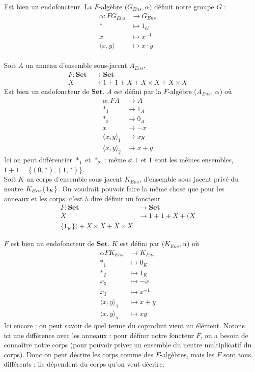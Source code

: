 \documentclass{article}
\begin{document}
Est bien un endofoncteur. La $F$-algèbre ($G_{Ens}, \alpha)$ définit notre groupe $G$ : 
\begin{align*}
    \alpha : F G_{Ens} & \rightarrow G_{Ens} \\
     * & \mapsto 1_G \\ 
     x & \mapsto x^{-1} \\ 
     \langle x,y \rangle & \mapsto x \cdot y
\end{align*}
\\ 
Soit $A$ un anneau d'ensemble sous-jacent $A_{Ens}$.
\begin{align*}
    F : \mathbf{Set}& \rightarrow \mathbf{Set} \\
      X & \rightarrow 1 + 1 + X + X \times X + X \times X
\end{align*}
Est bien un endofoncteur de $\mathbf{Set}$. $A$ est défini par la $F$-algèbre ($A_{Ens}$, $\alpha$) où 
\begin{align*}
    \alpha : F A & \rightarrow A \\
     *_1 & \mapsto 1_A \\
     *_2 & \mapsto 0_A \\ 
     x & \mapsto -x \\ 
      \langle x,y \rangle_1 & \mapsto xy \\ 
    \langle x,y \rangle_2 & \mapsto x+y
\end{align*}
Ici on peut différencier $*_1$ et $*_2$ : même si $1$ et $1$ sont les mêmes ensembles, $1+1 = \{ (0,*), (1,*) \}$. 
\\

Soit $K$ un corps d'ensemble sous jacent $K_{Ens}$, d'ensemble sous jacent privé du neutre $K_{Ens} \\ \{ 1_K \}$. On voudrait pouvoir faire la même chose que pour les anneaux et les corps, c'est à dire définir un foncteur 
\begin{align*}
    F : \mathbf{Set} &  \rightarrow \mathbf{Set} \\
      X & \rightarrow 1 + 1 + X + (X \\ \{1_K\}) + X \times X + X \times X
\end{align*}

$F$ est bien un endofoncteur de $\mathbf{Set}$. $K$ est défini par ($K_{Ens}, \alpha)$ où 
\begin{align*}
    \alpha F K_{Ens} & \rightarrow K_{Ens} \\ 
    *_1 & \mapsto 0_K \\ 
    *_2 & \mapsto 1_K \\ 
    x_3 & \mapsto -x \\ 
    x_3 & \mapsto x^{-1} \\ 
    \langle x, y \rangle_4 & \mapsto x + y \\ 
    \langle x, y \rangle_5 & \mapsto xy 
\end{align*}
Ici encore : on peut savoir de quel terme du coproduit vient un élément. Notons ici une différence avec les anneaux : pour définir notre foncteur $F$, on a besoin de connaître notre corps (pour pouvoir priver un ensemble du neutre multiplicatif du corps). Donc on peut décrire les corps comme des $F$-algèbres, mais les $F$ sont tous différents : ils dépendent du corps qu'on veut décrire.  
\end{document}
